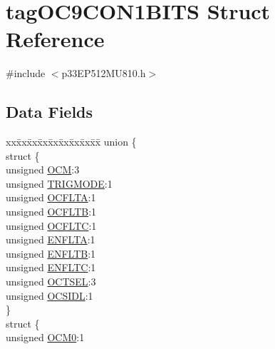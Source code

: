 \hypertarget{structtag_o_c9_c_o_n1_b_i_t_s}{}\section{tag\+O\+C9\+C\+O\+N1\+B\+I\+TS Struct Reference}
\label{structtag_o_c9_c_o_n1_b_i_t_s}


{\ttfamily \#include $<$p33\+E\+P512\+M\+U810.\+h$>$}

\subsection*{Data Fields}
\begin{DoxyCompactItemize}
\item 
\begin{tabbing}
xx\=xx\=xx\=xx\=xx\=xx\=xx\=xx\=xx\=\kill
union \{\\
\>struct \{\\
\>\>unsigned \hyperlink{structtag_o_c9_c_o_n1_b_i_t_s_a778fa0cf51a9477ac4e82d71a8733801}{OCM}:3\\
\>\>unsigned \hyperlink{structtag_o_c9_c_o_n1_b_i_t_s_a7a0057e0dca6e2663584b5b9e1da04c3}{TRIGMODE}:1\\
\>\>unsigned \hyperlink{structtag_o_c9_c_o_n1_b_i_t_s_acc967e41cecdeedc6ad4422f9ef1a6a3}{OCFLTA}:1\\
\>\>unsigned \hyperlink{structtag_o_c9_c_o_n1_b_i_t_s_a1fb30bb4421ef7c4bd0c66c379875593}{OCFLTB}:1\\
\>\>unsigned \hyperlink{structtag_o_c9_c_o_n1_b_i_t_s_a69a1772a4144abd579d17d28445b9934}{OCFLTC}:1\\
\>\>unsigned \hyperlink{structtag_o_c9_c_o_n1_b_i_t_s_a1e0f05fb23d516e003e4713fe8c1498a}{ENFLTA}:1\\
\>\>unsigned \hyperlink{structtag_o_c9_c_o_n1_b_i_t_s_a9d7aa97d5328b8b81ab7fd9145dfa0fc}{ENFLTB}:1\\
\>\>unsigned \hyperlink{structtag_o_c9_c_o_n1_b_i_t_s_a0b6f25c0f83f33b5501b6a2e6141a6ef}{ENFLTC}:1\\
\>\>unsigned \hyperlink{structtag_o_c9_c_o_n1_b_i_t_s_ae37d2a41dae2d2af1d82f7caae33cadb}{OCTSEL}:3\\
\>\>unsigned \hyperlink{structtag_o_c9_c_o_n1_b_i_t_s_afd05f4f249db4ef69b684e2f3fa6b703}{OCSIDL}:1\\
\>\} \\
\>struct \{\\
\>\>unsigned \hyperlink{structtag_o_c9_c_o_n1_b_i_t_s_a9271e84c9759ff10a7bc1cee3276e8f6}{OCM0}:1\\

\end{tabbing}
\end{DoxyCompactItemize}
